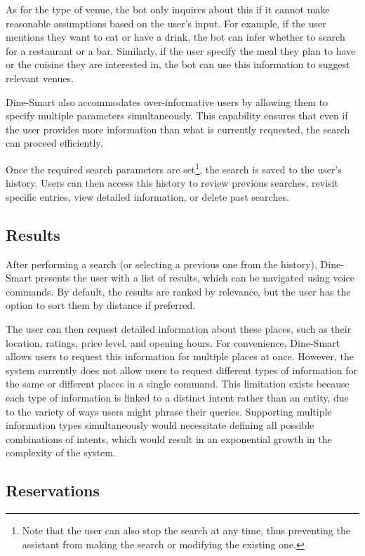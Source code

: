 \documentclass[twocolumn]{article}
\begin{document}
As for the type of venue, the bot only inquires about this if it cannot make reasonable assumptions based on the user’s input. For example, if the user mentions they want to eat or have a drink, the bot can infer whether to search for a restaurant or a bar. Similarly,
if the user specify the meal they plan to have or the cuisine they are interested in, the bot can use this information to suggest relevant venues.

Dine-Smart also accommodates over-informative users by allowing them to specify multiple parameters simultaneously. This capability ensures that even if the user provides more information than what is currently requested, the search can proceed efficiently.

Once the required search parameters are set\footnote{Note that the user can also stop the search at any time, thus preventing the assistant from making the search or modifying the existing one.}, the search is saved to the user’s history. Users can then access this history to review previous searches, revisit specific entries, view detailed information, or delete past searches.

\subsection{Results}

After performing a search (or selecting a previous one from the history), Dine-Smart presents the user with a list of results, which can be navigated using voice commands. By default, the results are ranked by relevance, but the user has the option to sort them by distance if preferred.

The user can then request detailed information about these places, such as their location, ratings, price level, and opening hours. For convenience, Dine-Smart allows users to request this information for multiple places at once. However, the system currently does not allow users to request different types of information for the same or different places in a single command. This limitation exists because each type of information is linked to a distinct intent rather than an entity, due to the variety of ways users might phrase their queries. Supporting multiple information types simultaneously would necessitate defining all possible combinations of intents, which would result in an exponential growth in the complexity of the system.

\subsection{Reservations}
\end{document}
